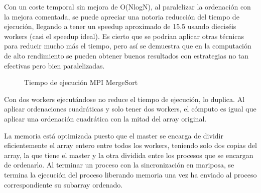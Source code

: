		Con un coste temporal sin mejora de O(NlogN), al paralelizar la ordenación con la mejora comentada, se puede apreciar una notoria reducción del tiempo de ejecución, llegando a tener un speedup aproximado de 15.5 usando dieciséis workers (casi el speedup ideal). Es cierto que se podrían aplicar otras técnicas para reducir mucho más el tiempo, pero así se demuestra que en la computación de alto rendimiento se pueden obtener buenos resultados con estrategias no tan efectivas pero bien paralelizadas.
		
		\begin{figure}[!h]
		\caption{Tiempo de ejecución MPI MergeSort}
		\end{figure}
		
		Con dos workers ejecutándose no reduce el tiempo de ejecución, lo duplica. Al aplicar ordenaciones cuadráticas y solo tener dos workers, el cómputo es igual que aplicar una ordenación cuadrática con la mitad del array original.
		
		La memoria está optimizada puesto que el master se encarga de dividir eficientemente el array entero entre todos los workers, teniendo solo dos copias del array, la que tiene el master y la otra dividida entre los procesos que se encargan de ordenarlo. Al terminar un proceso con la sincronización en mariposa, se termina la ejecución del proceso liberando memoria una vez ha enviado al proceso correspondiente su subarray ordenado.
		
